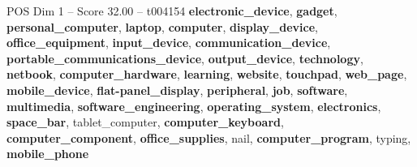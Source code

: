 \begin{textsample}{POS Dim 1 – Score 32.00 – t004154}  \label{ex:f1_pos_011}
\textbf{electronic\_device}, \textbf{gadget}, \textbf{personal\_computer}, \textbf{laptop}, \textbf{computer}, \textbf{display\_device}, \textbf{office\_equipment}, \textbf{input\_device}, \textbf{communication\_device}, \textbf{portable\_communications\_device}, \textbf{output\_device}, \textbf{technology}, \textbf{netbook}, \textbf{computer\_hardware}, \textbf{learning}, \textbf{website}, \textbf{touchpad}, \textbf{web\_page}, \textbf{mobile\_device}, \textbf{flat-panel\_display}, \textbf{peripheral}, \textbf{job}, \textbf{software}, \textbf{multimedia}, \textbf{software\_engineering}, \textbf{operating\_system}, \textbf{electronics}, \textbf{space\_bar}, tablet\_computer, \textbf{computer\_keyboard}, \textbf{computer\_component}, \textbf{office\_supplies}, nail, \textbf{computer\_program}, typing, \textbf{mobile\_phone}

\end{textsample}
